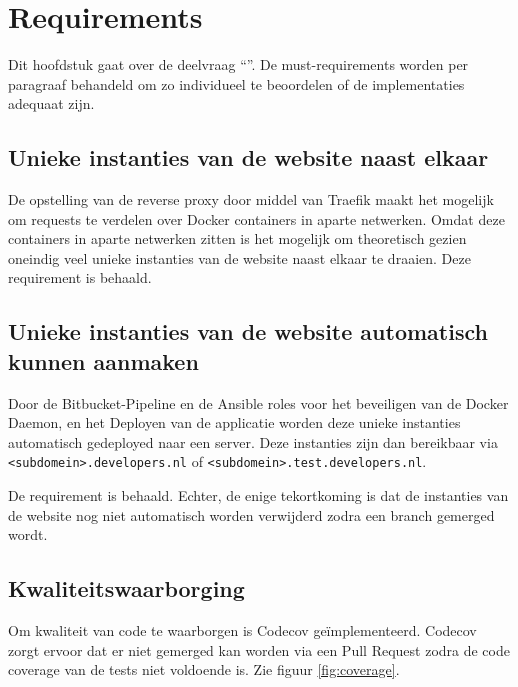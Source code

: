 \chapter{Requirements}

\label{Chapter7}

Dit hoofdstuk gaat over de deelvraag \enquote{\deelrequirements}. De must-requirements worden per paragraaf behandeld om zo individueel te beoordelen of de implementaties adequaat zijn.

\section{Unieke instanties van de website naast elkaar}
De opstelling van de reverse proxy door middel van Traefik maakt het mogelijk om requests te verdelen over Docker containers in aparte netwerken. Omdat deze containers in aparte netwerken zitten is het mogelijk om theoretisch gezien oneindig veel unieke instanties van de website naast elkaar te draaien. Deze requirement is behaald.

\section{Unieke instanties van de website automatisch kunnen aanmaken}
Door de Bitbucket-Pipeline en de Ansible roles voor het beveiligen van de Docker Daemon, en het Deployen van de applicatie worden deze unieke instanties automatisch gedeployed naar een server. Deze instanties zijn dan bereikbaar via \texttt{<subdomein>.developers.nl} of \texttt{<subdomein>.test.developers.nl}.

De requirement is behaald. Echter, de enige tekortkoming is dat de instanties van de website nog niet automatisch worden verwijderd zodra een branch gemerged wordt.

\section{Kwaliteitswaarborging}
Om kwaliteit van code te waarborgen is Codecov geïmplementeerd. Codecov zorgt ervoor dat er niet gemerged kan worden via een Pull Request zodra de code coverage van de tests niet voldoende is. Zie figuur \ref{fig:coverage}.

